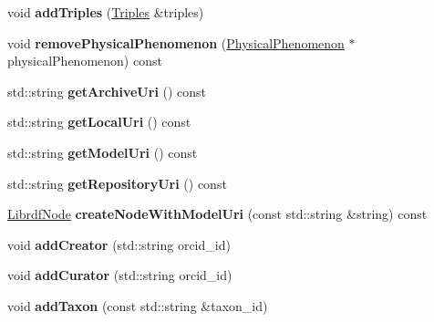 \begin{DoxyCompactItemize}
void {\bfseries add\+Triples} (\hyperlink{classomexmeta_1_1Triples}{Triples} \&triples)
\item 
\mbox{\label{classomexmeta_1_1Editor_af00f00108238acbf2b2974cedc07b454}} 
void {\bfseries remove\+Physical\+Phenomenon} (\hyperlink{classomexmeta_1_1PhysicalPhenomenon}{Physical\+Phenomenon} $\ast$physical\+Phenomenon) const
\item 
\mbox{\label{classomexmeta_1_1Editor_a736e49794c5a358f06d13d41c3657fe2}} 
std\+::string {\bfseries get\+Archive\+Uri} () const
\item 
\mbox{\label{classomexmeta_1_1Editor_a8494826923de713c19f971fd9c7908c0}} 
std\+::string {\bfseries get\+Local\+Uri} () const
\item 
\mbox{\label{classomexmeta_1_1Editor_a0020d3b9c3e91fb37c134ba8b211c13e}} 
std\+::string {\bfseries get\+Model\+Uri} () const
\item 
\mbox{\label{classomexmeta_1_1Editor_a2264cbd2efae17d1d72c3f402d8721bf}} 
std\+::string {\bfseries get\+Repository\+Uri} () const
\item 
\mbox{\label{classomexmeta_1_1Editor_a5143e1f8db82393faed322810acf5e92}} 
\hyperlink{classredland_1_1LibrdfNode}{Librdf\+Node} {\bfseries create\+Node\+With\+Model\+Uri} (const std\+::string \&string) const
\item 
\mbox{\label{classomexmeta_1_1Editor_a9c8b060005146f3cf5a231ea6789e7d7}} 
void {\bfseries add\+Creator} (std\+::string orcid\+\_\+id)
\item 
\mbox{\label{classomexmeta_1_1Editor_a8b83488faf68546733114acf54595b02}} 
void {\bfseries add\+Curator} (std\+::string orcid\+\_\+id)
\item 
\mbox{\label{classomexmeta_1_1Editor_af64f0cac6b7e27b121df94ab5b1fa217}} 
void {\bfseries add\+Taxon} (const std\+::string \&taxon\+\_\+id)
\item 
\mbox{\label{classomexmeta_1_1Editor_a533f93c8ae0c3081dfe2fc8e8ebee8ea}} 

\end{DoxyCompactItemize}
